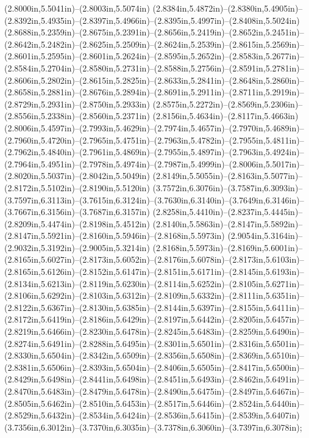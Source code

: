 (2.8000in,5.5041in)--(2.8003in,5.5074in) (2.8384in,5.4872in)--(2.8380in,5.4905in)--(2.8392in,5.4935in)--(2.8397in,5.4966in)--(2.8395in,5.4997in)--(2.8408in,5.5024in) (2.8688in,5.2359in)--(2.8675in,5.2391in)--(2.8656in,5.2419in)--(2.8652in,5.2451in)--(2.8642in,5.2482in)--(2.8625in,5.2509in)--(2.8624in,5.2539in)--(2.8615in,5.2569in)--(2.8601in,5.2595in)--(2.8601in,5.2624in)--(2.8595in,5.2652in)--(2.8583in,5.2677in)--(2.8584in,5.2704in)--(2.8580in,5.2731in)--(2.8588in,5.2756in)--(2.8591in,5.2781in)--(2.8606in,5.2802in)--(2.8615in,5.2825in)--(2.8633in,5.2841in)--(2.8648in,5.2860in)--(2.8658in,5.2881in)--(2.8676in,5.2894in)--(2.8691in,5.2911in)--(2.8711in,5.2919in)--(2.8729in,5.2931in)--(2.8750in,5.2933in) (2.8575in,5.2272in)--(2.8569in,5.2306in)--(2.8556in,5.2338in)--(2.8560in,5.2371in) (2.8156in,5.4634in)--(2.8117in,5.4663in) (2.8006in,5.4597in)--(2.7993in,5.4629in)--(2.7974in,5.4657in)--(2.7970in,5.4689in)--(2.7960in,5.4720in)--(2.7965in,5.4751in)--(2.7963in,5.4782in)--(2.7955in,5.4811in)--(2.7962in,5.4840in)--(2.7961in,5.4869in)--(2.7955in,5.4897in)--(2.7963in,5.4924in)--(2.7964in,5.4951in)--(2.7978in,5.4974in)--(2.7987in,5.4999in)--(2.8006in,5.5017in)--(2.8020in,5.5037in)--(2.8042in,5.5049in) (2.8149in,5.5055in)--(2.8163in,5.5077in)--(2.8172in,5.5102in)--(2.8190in,5.5120in) (3.7572in,6.3076in)--(3.7587in,6.3093in)--(3.7597in,6.3113in)--(3.7615in,6.3124in)--(3.7630in,6.3140in)--(3.7649in,6.3146in)--(3.7667in,6.3156in)--(3.7687in,6.3157in) (2.8258in,5.4410in)--(2.8237in,5.4445in)--(2.8209in,5.4474in)--(2.8198in,5.4512in) (2.8140in,5.5863in)--(2.8147in,5.5892in)--(2.8147in,5.5921in)--(2.8160in,5.5946in)--(2.8168in,5.5973in) (2.9054in,5.3164in)--(2.9032in,5.3192in)--(2.9005in,5.3214in) (2.8168in,5.5973in)--(2.8169in,5.6001in)--(2.8165in,5.6027in)--(2.8173in,5.6052in)--(2.8176in,5.6078in)--(2.8173in,5.6103in)--(2.8165in,5.6126in)--(2.8152in,5.6147in)--(2.8151in,5.6171in)--(2.8145in,5.6193in)--(2.8134in,5.6213in)--(2.8119in,5.6230in)--(2.8114in,5.6252in)--(2.8105in,5.6271in)--(2.8106in,5.6292in)--(2.8103in,5.6312in)--(2.8109in,5.6332in)--(2.8111in,5.6351in)--(2.8122in,5.6367in)--(2.8130in,5.6385in)--(2.8144in,5.6397in)--(2.8155in,5.6411in)--(2.8172in,5.6419in)--(2.8186in,5.6429in)--(2.8197in,5.6442in)--(2.8205in,5.6457in)--(2.8219in,5.6466in)--(2.8230in,5.6478in)--(2.8245in,5.6483in)--(2.8259in,5.6490in)--(2.8274in,5.6491in)--(2.8288in,5.6495in)--(2.8301in,5.6501in)--(2.8316in,5.6501in)--(2.8330in,5.6504in)--(2.8342in,5.6509in)--(2.8356in,5.6508in)--(2.8369in,5.6510in)--(2.8381in,5.6506in)--(2.8393in,5.6504in)--(2.8406in,5.6505in)--(2.8417in,5.6500in)--(2.8429in,5.6498in)--(2.8441in,5.6498in)--(2.8451in,5.6493in)--(2.8462in,5.6491in)--(2.8470in,5.6483in)--(2.8479in,5.6478in)--(2.8490in,5.6475in)--(2.8497in,5.6467in)--(2.8505in,5.6462in)--(2.8510in,5.6453in)--(2.8517in,5.6446in)--(2.8524in,5.6440in)--(2.8529in,5.6432in)--(2.8534in,5.6424in)--(2.8536in,5.6415in)--(2.8539in,5.6407in) (3.7356in,6.3012in)--(3.7370in,6.3035in)--(3.7378in,6.3060in)--(3.7397in,6.3078in);
